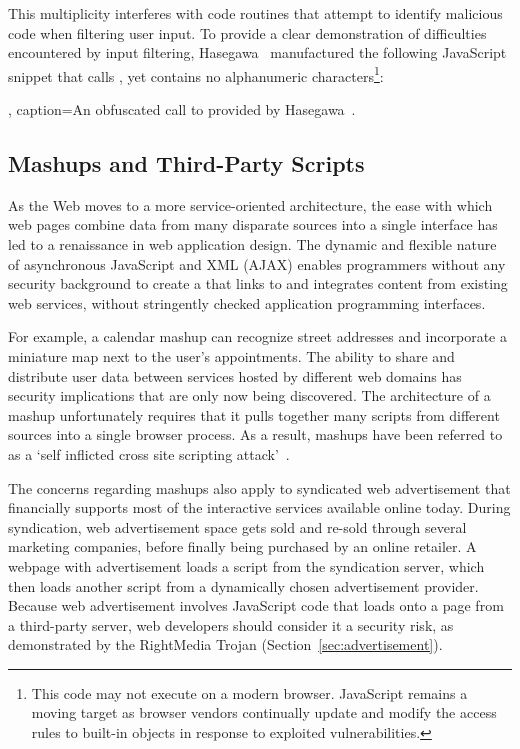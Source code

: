 This multiplicity interferes with code routines that attempt to identify malicious code when filtering user input.
To provide a clear demonstration of difficulties encountered by input filtering, Hasegawa~\cite{xssfilters} manufactured the following JavaScript snippet that calls , yet contains no alphanumeric characters\footnote{This code may not execute on a modern browser. JavaScript remains a moving target as browser vendors continually update and modify the access rules to built-in objects in response to exploited vulnerabilities.}:

\lstset{
  label=list:obfuscated-alert},
  caption={An obfuscated call to  provided by Hasegawa~\cite{xssfilters}.
}
\begin{jscode}
($=[$=[]][(__=!$+$)[_=-~-~-~$]+(\{\}+$)[_/_]+($$=($_=!''+$)
[_/_]+$_[+$])])()[__[_/_]+__[_+~$]+$_[_]+$$](_/_)
\end{jscode}

\subsection{Mashups and Third-Party Scripts}\label{sec:mashups}

As the Web moves to a more service-oriented architecture, the ease with which web pages combine data from many disparate sources into a single interface has led to a renaissance in web application design.
The dynamic and flexible nature of asynchronous JavaScript and XML (AJAX) enables programmers without any security background to create a  that links to and integrates content from existing web services, without stringently checked application programming interfaces.

For example, a calendar mashup can recognize street addresses and incorporate a miniature map next to the user's appointments.
The ability to share and distribute user data between services hosted by different web domains has security implications that are only now being discovered.
The architecture of a mashup unfortunately requires that it pulls together many scripts from different sources into a single browser process.
As a result, mashups have been referred to as a `self inflicted cross site scripting attack'~\cite{mashup}.

The concerns regarding mashups also apply to syndicated web advertisement that financially supports most of the interactive services available online today.
During syndication, web advertisement space gets sold and re-sold through several marketing companies, before finally being purchased by an online retailer.
A webpage with advertisement loads a script from the syndication server, which then loads another script from a dynamically chosen advertisement provider.
Because web advertisement involves JavaScript code that loads onto a page from a third-party server, web developers should consider it a security risk, as demonstrated by the RightMedia Trojan (Section~\ref{sec:advertisement}).

